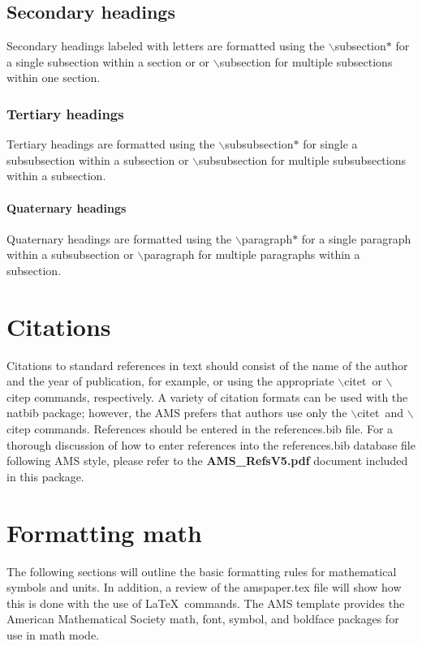 \documentclass{ametsocV5}
\begin{document}
\subsection*{Secondary headings} 
Secondary headings labeled with letters are formatted using the
$\backslash$subsection$*${\tt\string{\string}} for a single
subsection within a section or
 or $\backslash$subsection{\tt\string{\string}} 
for multiple
subsections within one section.

\subsubsection*{Tertiary headings} 
Tertiary headings are formatted using the
$\backslash$subsubsection$*${\tt\string{\string}} for single a subsubsection
within a subsection or
$\backslash$subsubsection{\tt\string{\string}} 
for multiple subsubsections
within a subsection. 

\paragraph*{Quaternary headings} 
Quaternary headings are formatted using the
$\backslash$paragraph$*${\tt\string{\string}} for a single paragraph within
a subsubsection or
$\backslash$paragraph{\tt\string{\string}} 
for multiple paragraphs
within a subsection.

\section{Citations}
Citations to standard references in text should consist of the name of the
author and the year of publication, for example, \citet{Becker+Schmitz2003} or
\citep{Becker+Schmitz2003} using the appropriate $\backslash$citet\ or
$\backslash$citep commands, respectively. A variety of citation formats can
be used with the natbib package; however, the AMS prefers that authors use only the $\backslash$citet\ and
$\backslash$citep commands. References should be entered in the references.bib file. For a thorough
discussion of how to enter references into the references.bib database file
following AMS style, please refer to the \textbf{AMS\_RefsV5.pdf} document
included in this package.

\section{Formatting math}
The following sections will outline the basic formatting rules for
mathematical symbols and units.  In addition, a review of the amspaper.tex
file will show how this is done with the use of \LaTeX\ commands.  The AMS
template provides the American Mathematical Society math, font, symbol, and
boldface packages for use in math mode.
\end{document}
